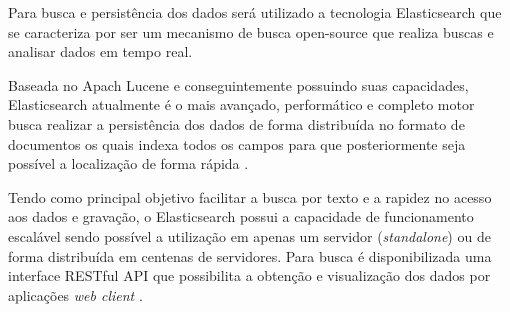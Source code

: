 Para busca e persistência dos dados será utilizado a tecnologia Elasticsearch que se caracteriza por ser um mecanismo de busca open-source que realiza buscas e analisar dados em tempo real.

Baseada no Apach Lucene e conseguintemente possuindo suas capacidades, Elasticsearch atualmente é o mais avançado, performático e completo motor busca realizar a persistência dos dados de forma distribuída no formato de documentos os quais indexa todos os campos para que posteriormente seja possível a localização de forma rápida \cite{Gormley:2015}. 

Tendo como principal objetivo facilitar a busca por texto e a rapidez no acesso aos dados e gravação, 
o Elasticsearch possui a capacidade de funcionamento escalável sendo possível a utilização em apenas um servidor (\textit{standalone}) ou de forma distribuída em centenas de servidores.
Para busca é disponibilizada uma interface RESTful API que possibilita a obtenção e visualização dos dados por aplicações \textit{web client} \cite{Gormley:2015}.
